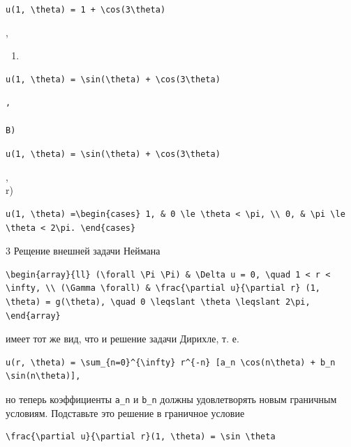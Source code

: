 \documentclass[
  ukrainian,
]{article}
\providecommand{\tightlist}{%
  \setlength{\itemsep}{0pt}\setlength{\parskip}{0pt}}
\begin{document}
\texttt{u(1,\ \textbackslash{}theta)\ =\ 1\ +\ \textbackslash{}cos(3\textbackslash{}theta)}

,

\begin{enumerate}
\def\labelenumi{\Alph{enumi})}
\setcounter{enumi}{1}
\tightlist
\item
\end{enumerate}

\begin{verbatim}
u(1, \theta) = \sin(\theta) + \cos(3\theta)
\end{verbatim}

\begin{verbatim}
,

B)
\end{verbatim}

\texttt{u(1,\ \textbackslash{}theta)\ =\ \textbackslash{}sin(\textbackslash{}theta)\ +\ \textbackslash{}cos(3\textbackslash{}theta)}

,\\
r)

\begin{verbatim}
u(1, \theta) =\begin{cases} 1, & 0 \le \theta < \pi, \\ 0, & \pi \le \theta < 2\pi. \end{cases}
\end{verbatim}

3 Рещение внешней задачи Неймана

\begin{verbatim}
\begin{array}{ll} (\forall \Pi \Pi) & \Delta u = 0, \quad 1 < r < \infty, \\ (\Gamma \forall) & \frac{\partial u}{\partial r} (1, \theta) = g(\theta), \quad 0 \leqslant \theta \leqslant 2\pi, \end{array}
\end{verbatim}

имеет тот же вид, что и решение задачи Дирихле, т. е.

\begin{verbatim}
u(r, \theta) = \sum_{n=0}^{\infty} r^{-n} [a_n \cos(n\theta) + b_n \sin(n\theta)],
\end{verbatim}

но теперь коэффициенты \texttt{a\_n} и \texttt{b\_n} должны
удовлетворять новым граничным условиям. Подставьте это решение в
граничное условие

\begin{verbatim}
\frac{\partial u}{\partial r}(1, \theta) = \sin \theta
\end{verbatim}
\end{document}
